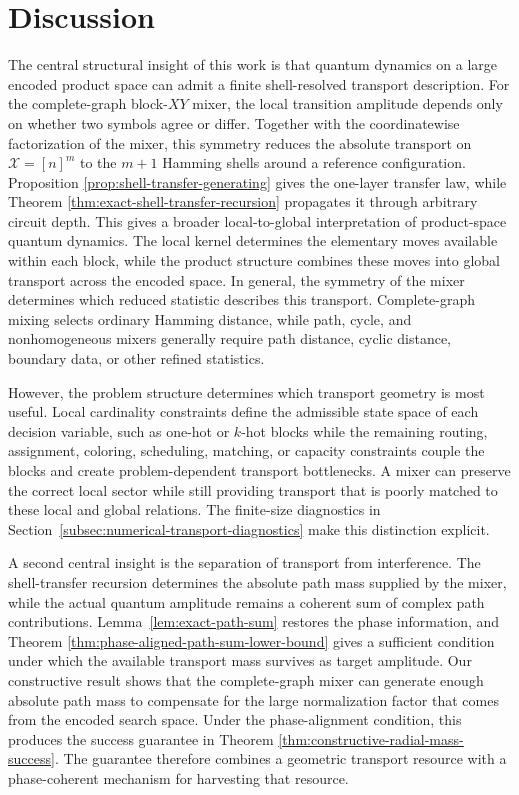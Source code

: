 \documentclass[a4paper,onecolumn,11pt,unpublished]{quantumarticle}
\theoremstyle{remark}
\begin{document}
\section{Discussion}
\label{sec:discussion}



The central structural insight of this work is that quantum dynamics on a large encoded product space can admit a finite shell-resolved transport description. For the complete-graph block-\(XY\) mixer, the local transition
amplitude depends only on whether two symbols agree or differ. Together with the coordinatewise factorization of the mixer, this symmetry reduces the absolute transport on \(\mathcal X=[n]^m\) to the \(m+1\) Hamming shells around a reference configuration. Proposition
\ref{prop:shell-transfer-generating} gives the one-layer transfer law, while
Theorem \ref{thm:exact-shell-transfer-recursion} propagates it through arbitrary circuit depth. This gives a broader local-to-global interpretation of product-space quantum
dynamics. The local kernel determines the elementary moves available within each block, while the product structure combines these moves into global transport across the encoded space. In general, the symmetry of the mixer determines
which reduced statistic describes this transport. Complete-graph mixing
selects ordinary Hamming distance, while path, cycle, and nonhomogeneous
mixers generally require path distance, cyclic distance, boundary data, or
other refined statistics.

However, the problem structure determines which transport geometry is most useful. Local
cardinality constraints define the admissible state space of each decision variable, such as one-hot or \(k\)-hot blocks while the remaining routing,
assignment, coloring, scheduling, matching, or capacity constraints couple the blocks and create problem-dependent transport bottlenecks. A mixer can
preserve the correct local sector while still providing transport that is poorly matched to these local and global relations. The finite-size diagnostics in
Section~\ref{subsec:numerical-transport-diagnostics} make this distinction explicit.

A second central insight is the separation of transport from interference.
The shell-transfer recursion determines the absolute path mass supplied by
the mixer, while the actual quantum amplitude remains a coherent sum of complex path contributions. Lemma~\ref{lem:exact-path-sum} restores the phase information, and Theorem
\ref{thm:phase-aligned-path-sum-lower-bound} gives a sufficient condition under which the available transport mass survives as target amplitude. Our constructive result shows that the complete-graph mixer can generate enough absolute path mass to compensate for the large normalization factor that comes from the encoded search space. Under the phase-alignment condition, this produces the success guarantee in Theorem
\ref{thm:constructive-radial-mass-success}. The guarantee therefore combines
a geometric transport resource with a phase-coherent mechanism for harvesting
that resource.
\end{document}
